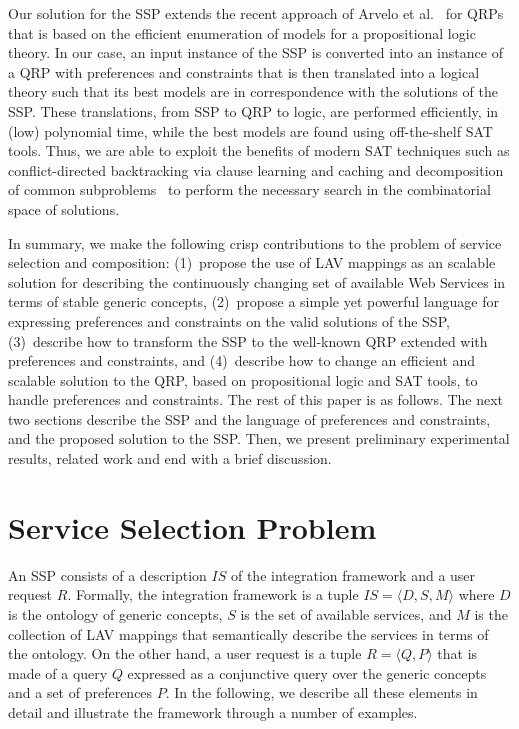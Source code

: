 \documentclass{llncs}
\newcommand{\tup}[1]{\langle #1 \rangle}
\begin{document}
Our solution for the SSP extends the recent approach of Arvelo et
al.~\cite{arvelo:aaai06} for QRPs that is based on the efficient 
enumeration of models for a propositional logic theory.
In our case, an input instance of the SSP is converted into an instance
of a QRP with preferences and constraints that is then translated
into a logical theory such that its best models are in correspondence
with the solutions of the SSP. These translations, from SSP to QRP to
logic, are performed efficiently, in (low) polynomial time, while the
best models are found using off-the-shelf SAT tools.
Thus, we are able to exploit the benefits of modern SAT techniques such
as conflict-directed backtracking via clause learning and caching and
decomposition of common subproblems~\cite{beame:understanding} to
perform the necessary search in the combinatorial space of solutions.

In summary, we make the following crisp contributions to the problem of 
service selection and composition: (1)~propose the use of LAV mappings
as an scalable solution for describing the continuously changing set
of available Web Services in terms of stable generic concepts,
(2)~propose a simple yet powerful language for expressing preferences
and constraints on the valid solutions of the SSP, 
(3)~describe how to transform the SSP to the well-known QRP extended with
preferences and constraints, and
(4)~describe how to change an efficient and scalable solution to the QRP,
based on propositional logic and SAT tools, to handle preferences and constraints.
The rest of this paper is as follows. The next two sections describe the
SSP and the language of preferences and constraints, and the proposed solution to the SSP.
Then, we present preliminary experimental results, related work 
and end with a brief discussion.

\section{Service Selection Problem}

An SSP consists of a description $IS$ of the integration framework
and a user request $R$.
Formally, the integration framework is a tuple $IS=\tup{D,S,M}$
where $D$ is the ontology of generic concepts, $S$ is the set
of available services, and $M$ is the collection of LAV mappings that
semantically describe the services in terms of the ontology.
On the other hand, a user request is a tuple $R=\tup{Q,P}$
that is made of a query $Q$ expressed as a conjunctive query over
the generic concepts and a set of preferences $P$.
In the following, we describe all these elements in detail and
illustrate the framework through a number of examples.
\end{document}

